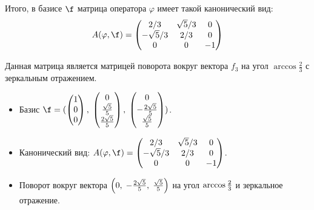 Итого, в базисе $\f$ матрица оператора $\varphi$ имеет такой канонический вид:
\[
    A(\varphi, \f) =
    \begin{pmatrix}
        2/3         & \sqrt{5}/3 & 0  \\
        -\sqrt{5}/3 & 2/3        & 0  \\
        0           & 0          & -1
    \end{pmatrix}
\]

Данная матрица является матрицей поворота вокруг вектора $f_3$ на угол $\arccos{\frac{2}{3}}$ с зеркальным отражением.

\begin{itemize}
    \item Базис
          $
              \f =
              (
              \begin{pmatrix}
                  1 \\
                  0 \\
                  0
              \end{pmatrix}, \;
              \begin{pmatrix}
                  0               \\
                  \d{\sqrt{5}}{5} \\
                  \d{2 \sqrt{5}}{5}
              \end{pmatrix}, \;
              \begin{pmatrix}
                  0                  \\
                  -\d{2 \sqrt{5}}{5} \\
                  \d{\sqrt{5}}{5}
              \end{pmatrix}
              )
          $.

    \item Канонический вид:
          $
              A(\varphi, \f)
              =
              \begin{pmatrix}
                  2/3         & \sqrt{5}/3 & 0  \\
                  -\sqrt{5}/3 & 2/3        & 0  \\
                  0           & 0          & -1
              \end{pmatrix}
          $.

    \item Поворот вокруг вектора $\left(0,\; -\frac{2 \sqrt{5}}{5},\; \frac{\sqrt{5}}{5}\right)$ на угол $\arccos{\frac{2}{3}}$ и зеркальное отражение.
\end{itemize}
